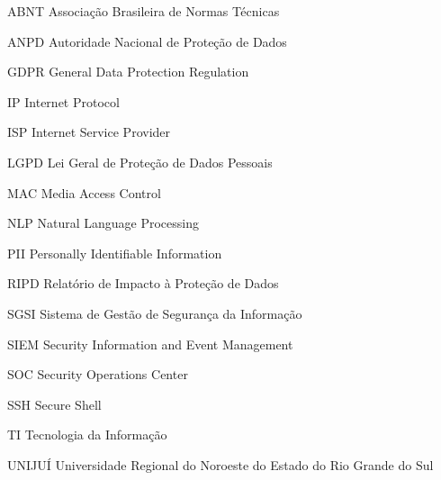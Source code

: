\documentclass[
    12pt,
    oneside,
    a4paper,
    chapter=TITLE,
    section=TITLE,
    english,
    brazil
]{abntex2}
\begin{document}
\begin{siglas}
    \item[ABNT]   Associação Brasileira de Normas Técnicas
    \item[ANPD]   Autoridade Nacional de Proteção de Dados
    \item[GDPR]   General Data Protection Regulation
    \item[IP]     Internet Protocol
    \item[ISP]    Internet Service Provider
    \item[LGPD]   Lei Geral de Proteção de Dados Pessoais
    \item[MAC]    Media Access Control
    \item[NLP]    Natural Language Processing
    \item[PII]    Personally Identifiable Information
    \item[RIPD]   Relatório de Impacto à Proteção de Dados
    \item[SGSI]   Sistema de Gestão de Segurança da Informação
    \item[SIEM]   Security Information and Event Management
    \item[SOC]    Security Operations Center
    \item[SSH]    Secure Shell
    \item[TI]     Tecnologia da Informação
    \item[UNIJUÍ] Universidade Regional do Noroeste do Estado do Rio Grande do Sul
\end{siglas}

\tableofcontents*
\cleardoublepage

\textual











\postextual



\begin{apendicesenv}
    
\end{apendicesenv}
\end{document}
